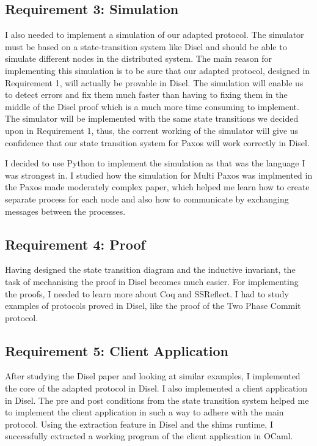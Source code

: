 \subsection{Requirement 3: Simulation}
I also needed to implement a simulation of our adapted protocol. The simulator
must be based on a state-transition system like Disel and should be able
to simulate different nodes in the distributed system. The main reason for
implementing this simulation is to be sure that our adapted protocol, designed
in Requirement 1, will actually be provable in Disel. The simulation will enable
us to detect errors and fix them much faster than having to fixing them in the
middle of the Disel proof which is a much more time consuming to implement.
The simulator will be implemented with the same state transitions we decided
upon in Requirement 1, thus, the corrent working of the simulator will give us
confidence that our state transition system for Paxos will work correctly in Disel.

I decided to use Python to implement the simulation as that was the language I
was strongest in. I studied how the simulation for Multi Paxos was implmented
in the Paxos made moderately complex paper, %
which helped me learn how to create separate process for each node and also how
to communicate by exchanging messages between the processes.

\subsection{Requirement 4: Proof}
Having designed the state transition diagram and the inductive invariant,
the task of mechanising the proof in Disel becomes much easier.
For implementing the proofs, I needed to learn more about Coq and SSReflect.
I had to study examples of protocols proved in Disel, like the proof of the
Two Phase Commit protocol.

\subsection{Requirement 5: Client Application} %
After studying the Disel paper and looking at similar examples, I implemented the
core of the adapted protocol in Disel. I also implemented a client application in
Disel. The pre and post conditions from the state transition system helped me to
implement the client application in such a way to adhere with the main protocol.
Using the extraction feature in Disel and the shims runtime, I successfully
extracted a working program of the client application in OCaml.
